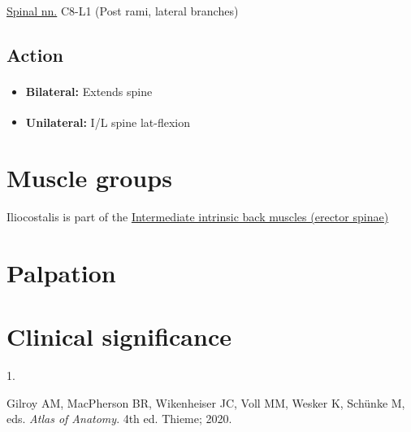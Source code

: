 \documentclass[
  letterpaper,
  DIV=11,
  numbers=noendperiod]{scrartcl}
\providecommand{\tightlist}{%
  \setlength{\itemsep}{0pt}\setlength{\parskip}{0pt}}\usepackage{longtable,booktabs,array}
\newlength{\cslhangindent}
\newlength{\csllabelwidth}
\newenvironment{CSLReferences}[2] %
 {\begin{list}{}{%
  \setlength{\itemindent}{0pt}
  \setlength{\leftmargin}{0pt}
  \setlength{\parsep}{0pt}
  \ifodd #1
   \setlength{\leftmargin}{\cslhangindent}
   \setlength{\itemindent}{-1\cslhangindent}
  \fi
  \setlength{\itemsep}{#2\baselineskip}}}
 {\end{list}}
\newcommand{\CSLLeftMargin}[1]{\parbox[t]{\csllabelwidth}{\strut#1\strut}}
\newcommand{\CSLRightInline}[1]{\parbox[t]{\linewidth - \csllabelwidth}{\strut#1\strut}}
\begin{document}
\href{../../../../Alchemy\%20Archive/Anatomy/Nerves/spinal_nerves.qmd}{Spinal
nn.} C8-L1 (Post rami, lateral
branches)\textsuperscript{}

\subsection{Action}\label{action-2}

\begin{itemize}
\tightlist
\item
  \textbf{Bilateral:} Extends
  spine\textsuperscript{}
\item
  \textbf{Unilateral:} I/L spine
  lat-flexion\textsuperscript{}
\end{itemize}

\section{Muscle groups}\label{muscle-groups}

Iliocostalis is part of the \href{}{Intermediate intrinsic back muscles
(erector spinae)}

\section{Palpation}\label{palpation}

\section*{Clinical significance}\label{clinical-significance}

\label{refs}
\begin{CSLReferences}{0}{1}
\CSLLeftMargin{1. }%
\CSLRightInline{Gilroy AM, MacPherson BR, Wikenheiser JC, Voll MM,
Wesker K, Schünke M, eds. \emph{Atlas of Anatomy}. 4th ed. {Thieme};
2020.}

\end{CSLReferences}
\end{document}
